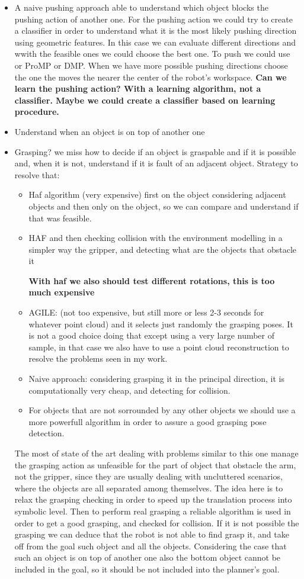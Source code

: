 \begin{itemize}
\item A naive pushing approach able to understand which object blocks the pushing action of another one.
For the pushing action we could try to create a classifier in order to understand what it is the most likely pushing direction using geometric features. In this case we can evaluate different directions and wwith the feasible ones we could choose the best one. 
To push we could use or ProMP or DMP. When we have more possible pushing directions choose the one the moves the nearer the center of the robot's workspace.
\textbf{Can we learn the pushing action? With a learning algorithm, not a classifier. Maybe we could create a classifier based on learning procedure.}
\item Understand when an object is on top of another one
\item Grasping? we miss how to decide if an object is graspable and if it is possible and, when it is not, understand if it is fault of an adjacent object. 
Strategy to resolve that:
\begin{itemize}
\item Haf algorithm (very expensive) first on the object considering adjacent objects and then only on the object, so we can compare and understand if that was feasible. 
\item HAF and then checking collision with the environment modelling in a simpler way the gripper, and detecting what are the objects that obstacle it

\textbf{With haf we also should test different rotations, this is too much expensive}
\item AGILE: (not too expensive, but still more or less 2-3 seconds for whatever point cloud) and it selects just randomly the grasping poses. It is not a good choice doing that except using a very large number of sample, in that case we also have to use a point cloud reconstruction to resolve the problems seen in my work. 
\item Naive approach: considering grasping it in the principal direction, it is computationally very cheap, and detecting for collision.
\item For objects that are not sorrounded by any other objects we should use a more powerfull algorithm in order to assure a good grasping pose detection.
\end{itemize} 
The most of state of the art dealing with problems similar to this one manage the grasping action as unfeasible for the part of object that obstacle the arm, not the gripper, since they are usually dealing with uncluttered scenarios, where the objects are all separated among themselves. The idea here is to relax the grasping checking in order to speed up the translation process into symbolic level. Then to perform real grasping a reliable algorithm is used in order to get a good grasping, and checked for collision. If it is not possible the grasping we can deduce that the robot is not able to find grasp it, and take off from the goal such object and all the objects. Considering the case that such an object is on top of another one also the bottom object cannot be included in the goal, so it should be not included into the planner's goal.
\end{itemize}
\fi




